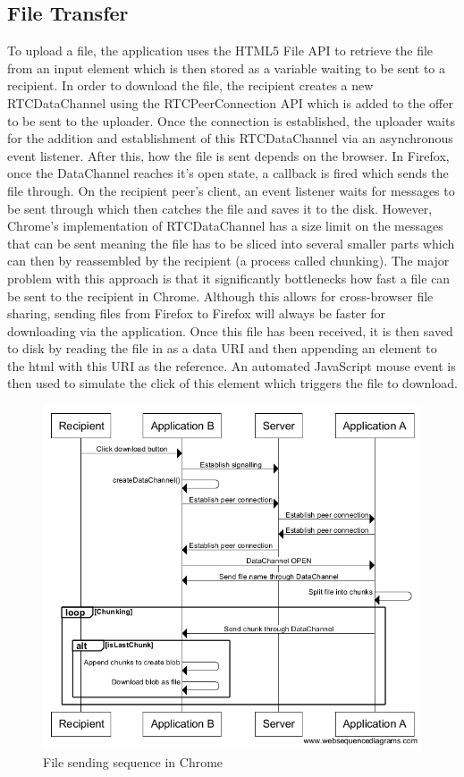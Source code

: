 \documentclass[]{report}
\begin{document}
			\subsection{File Transfer}
			To upload a file, the application uses the HTML5 File API to retrieve the file from an input element which is then stored as a variable waiting to be sent to a recipient. In order to download the file, the recipient creates a new RTCDataChannel using the RTCPeerConnection API which is added to the offer to be sent to the uploader. Once the connection is established, the uploader waits for the addition and establishment of this RTCDataChannel via an asynchronous event listener. After this, how the file is sent depends on the browser. In Firefox, once the DataChannel reaches it's open state, a callback is fired which sends the file through. On the recipient peer's client, an event listener waits for messages to be sent through which then catches the file and saves it to the disk. However, Chrome's implementation of RTCDataChannel has a size limit on the messages that can be sent meaning the file has to be sliced into several smaller parts which can then by reassembled by the recipient (a process called chunking). The major problem with this approach is that it significantly bottlenecks how fast a file can be sent to the recipient in Chrome. Although this allows for cross-browser file sharing, sending files from Firefox to Firefox will always be faster for downloading via the application. Once this file has been received, it is then saved to disk by reading the file in as a data URI and then appending an element to the html with this URI as the reference. An automated JavaScript mouse event is then used to simulate the click of this element which triggers the file to download. 
			
			\begin{figure}[H]
				\caption{File sending sequence in Chrome}
				\centering
				\includegraphics[scale=0.5]{file-sending-sequence-chrome.png}
			\end{figure}
			
\end{document}
